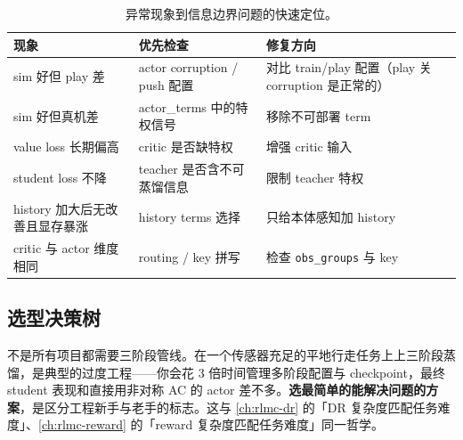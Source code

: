 \begin{table}[H]
\centering
\small
\caption{异常现象到信息边界问题的快速定位。}
\label{tab:rlmc-priv-diag}
\begin{tabular}{@{}p{3.4cm}p{4.0cm}p{4.2cm}@{}}
\toprule
现象 & 优先检查 & 修复方向 \\
\midrule
sim 好但 play 差 & actor corruption / push 配置 & 对比 train/play 配置（play 关 corruption 是正常的） \\
sim 好但真机差 & actor\_terms 中的特权信号 & 移除不可部署 term \\
value loss 长期偏高 & critic 是否缺特权 & 增强 critic 输入 \\
student loss 不降 & teacher 是否含不可蒸馏信息 & 限制 teacher 特权 \\
history 加大后无改善且显存暴涨 & history terms 选择 & 只给本体感知加 history \\
critic 与 actor 维度相同 & routing / key 拼写 & 检查 \texttt{obs\_groups} 与 key \\
\bottomrule
\end{tabular}
\end{table}

\subsection{选型决策树}
\label{sec:rlmc-priv-tree}

\begin{insight}[选最简单的够用方案]\label{ins:rlmc-priv-simplest}
不是所有项目都需要三阶段管线。在一个传感器充足的平地行走任务上上三阶段蒸馏，是典型的过度工程——你会花 3 倍时间管理多阶段配置与 checkpoint，最终 student 表现和直接用非对称 AC 的 actor 差不多。\textbf{选最简单的能解决问题的方案}，是区分工程新手与老手的标志。这与 \cref{ch:rlmc-dr} 的「DR 复杂度匹配任务难度」、\cref{ch:rlmc-reward} 的「reward 复杂度匹配任务难度」同一哲学。
\end{insight}

